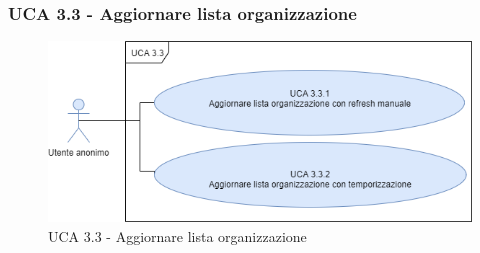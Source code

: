 \subsubsection{UCA 3.3 - Aggiornare lista organizzazione}%

\begin{figure}[h]
	\centering
	\includegraphics[scale=0.5]{sezioni/UseCase/Immagini/UCA3.3.png}
	\caption{UCA 3.3 - Aggiornare lista organizzazione}
\end{figure}

